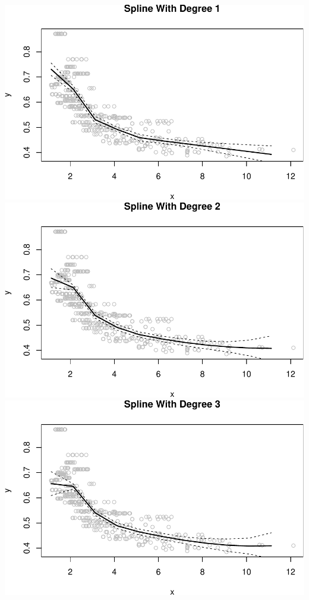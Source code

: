 \documentclass[]{article}
\begin{document}
\includegraphics{hw7_files/figure-latex/unnamed-chunk-10-1.pdf}
\includegraphics{hw7_files/figure-latex/unnamed-chunk-10-2.pdf}
\includegraphics{hw7_files/figure-latex/unnamed-chunk-10-3.pdf}
\end{document}
